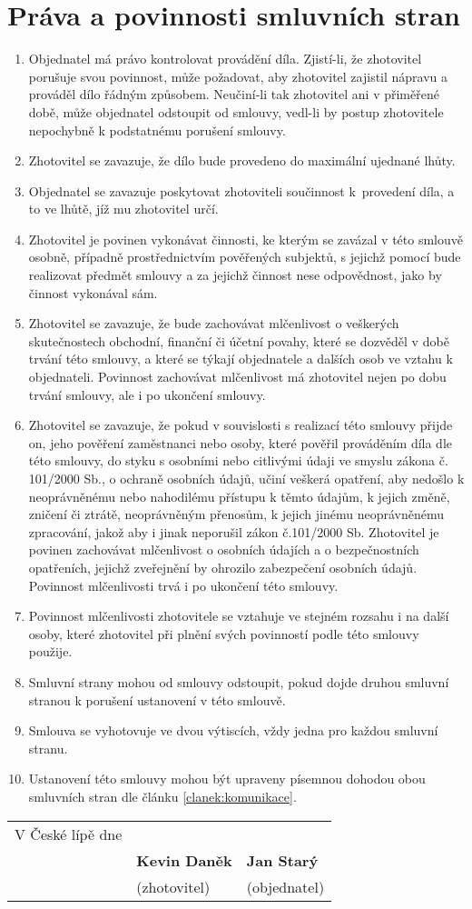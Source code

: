 \documentclass[]{article}
\begin{document}
\section{Práva a povinnosti smluvních stran}
\begin{enumerate}
	\item Objednatel má právo kontrolovat provádění díla. Zjistí-li, že zhotovitel porušuje svou povinnost, může požadovat, aby zhotovitel zajistil nápravu a prováděl dílo řádným způsobem. Neučiní-li tak zhotovitel ani v přiměřené době, může objednatel odstoupit od smlouvy, vedl-li by postup zhotovitele nepochybně k podstatnému porušení smlouvy.
	\item Zhotovitel se zavazuje, že dílo bude provedeno do maximální ujednané lhůty.
	\item Objednatel se zavazuje poskytovat zhotoviteli součinnost k provedení díla, a to ve lhůtě, jíž mu zhotovitel určí. 
	\item Zhotovitel je povinen vykonávat činnosti, ke kterým se zavázal v této smlouvě osobně, případně prostřednictvím
	pověřených subjektů, s jejichž pomocí bude realizovat předmět smlouvy a za jejichž činnost nese odpovědnost, jako by činnost vykonával sám.
	\item Zhotovitel se zavazuje, že bude zachovávat mlčenlivost o veškerých skutečnostech obchodní, finanční či účetní
	povahy, které se dozvěděl v době trvání této smlouvy, a které se týkají objednatele a dalších osob ve vztahu
	k objednateli. Povinnost zachovávat mlčenlivost má zhotovitel nejen po dobu trvání smlouvy, ale i po ukončení
	smlouvy.
	\item Zhotovitel se zavazuje, že pokud v souvislosti s realizací této smlouvy přijde on, jeho pověření zaměstnanci nebo osoby, které pověřil prováděním díla dle této smlouvy, do styku s osobními nebo citlivými údaji ve smyslu zákona č. 101/2000 Sb., o ochraně	osobních údajů, učiní veškerá opatření, aby nedošlo k neoprávněnému nebo nahodilému přístupu k těmto údajům, k jejich změně, zničení či ztrátě, neoprávněným přenosům, k jejich jinému neoprávněnému zpracování, jakož aby i jinak neporušil zákon č.101/2000 Sb. Zhotovitel je povinen zachovávat mlčenlivost o osobních údajích a o bezpečnostních opatřeních, jejichž zveřejnění by ohrozilo zabezpečení osobních údajů. Povinnost mlčenlivosti trvá i po ukončení této smlouvy.
	\item Povinnost mlčenlivosti zhotovitele se vztahuje ve stejném rozsahu i na další osoby, které zhotovitel při plnění svých povinností podle této smlouvy použije.
	\item Smluvní strany mohou od smlouvy odstoupit, pokud dojde druhou smluvní stranou k porušení ustanovení v této smlouvě.
	\item Smlouva se vyhotovuje ve dvou výtiscích, vždy jedna pro každou smluvní stranu.
	\item Ustanovení této smlouvy mohou být upraveny písemnou dohodou obou smluvních stran dle článku \ref{clanek:komunikace}.

\end{enumerate}

\begin{figure*}[!b]
	\begin{tabular}{@{}p{2in}p{2in}p{2in}@{}}
		V České lípě dne & \hrulefill & \hrulefill \\
		& \textbf{Kevin Daněk} & \textbf{Jan Starý} \\
		& (zhotovitel) & (objednatel) \\
	\end{tabular}
\end{figure*}
\end{document}
